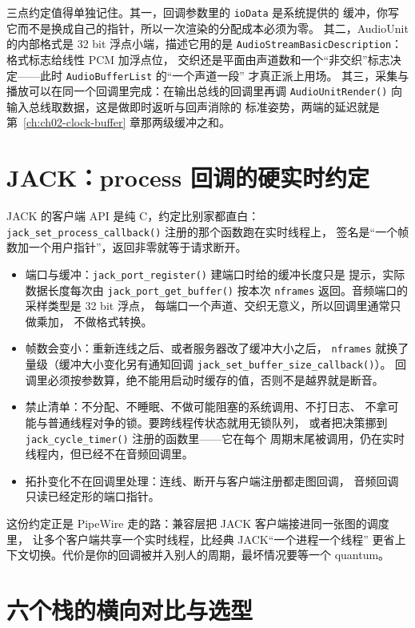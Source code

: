 \documentclass[12pt,a4paper,fontset=fandol]{ctexbook}
\newcommand{\Fn}[1]{\texttt{#1()}}
\newcommand{\Tp}[1]{\texttt{#1}}
\newcommand{\Lang}[1]{\textsf{#1}}
\newcommand{\CL}{\Lang{C}}
\begin{document}
三点约定值得单独记住。其一，回调参数里的 \Tp{ioData} 是系统提供的
缓冲，你写它而不是换成自己的指针，所以一次渲染的分配成本必须为零。
其二，AudioUnit 的内部格式是 32 bit 浮点小端，描述它用的是
\Tp{AudioStreamBasicDescription}：格式标志给线性 PCM 加浮点位，
交织还是平面由声道数和一个``非交织''标志决定——此时
\Tp{AudioBufferList} 的``一个声道一段'' 才真正派上用场。
其三，采集与播放可以在同一个回调里完成：在输出总线的回调里再调
\Fn{AudioUnitRender} 向输入总线取数据，这是做即时返听与回声消除的
标准姿势，两端的延迟就是第~\ref{ch:ch02-clock-buffer} 章那两级缓冲之和。

\section{JACK：process 回调的硬实时约定}
\label{sec:ch03-jack}

JACK 的客户端 API 是纯 \CL{}，约定比别家都直白：
\Fn{jack\_set\_process\_callback} 注册的那个函数跑在实时线程上，
签名是``一个帧数加一个用户指针''，返回非零就等于请求断开。

\begin{itemize}
  \item 端口与缓冲：\Fn{jack\_port\_register} 建端口时给的缓冲长度只是
        提示，实际数据长度每次由 \Fn{jack\_port\_get\_buffer}
        按本次 \Tp{nframes} 返回。音频端口的采样类型是 32 bit 浮点，
        每端口一个声道、交织无意义，所以回调里通常只做乘加，
        不做格式转换。
  \item 帧数会变小：重新连线之后、或者服务器改了缓冲大小之后，
        \Tp{nframes} 就换了量级（缓冲大小变化另有通知回调
        \Fn{jack\_set\allowbreak\_buffer\_size\allowbreak\_callback}）。
        回调里必须按参数算，绝不能用启动时缓存的值，否则不是越界就是断音。
  \item 禁止清单：不分配、不睡眠、不做可能阻塞的系统调用、不打日志、
        不拿可能与普通线程对争的锁。要跨线程传状态就用无锁队列，
        或者把决策挪到 \Fn{jack\_cycle\_timer} 注册的函数里——它在每个
        周期末尾被调用，仍在实时线程内，但已经不在音频回调里。
  \item 拓扑变化不在回调里处理：连线、断开与客户端注册都走图回调，
        音频回调只读已经定形的端口指针。
\end{itemize}

这份约定正是 PipeWire 走的路：兼容层把 JACK 客户端接进同一张图的调度里，
让多个客户端共享一个实时线程，比经典 JACK``一个进程一个线程''
更省上下文切换。代价是你的回调被并入别人的周期，最坏情况要等一个
quantum。

\section{六个栈的横向对比与选型}
\label{sec:ch03-compare}
\end{document}
